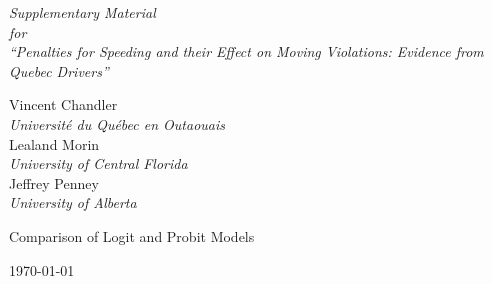 \phantom{0}
\vspace{1.0in}


\begin{centering}

{\huge \it
Supplementary Material  \\
\vspace{0.5in}
for \\
\vspace{0.5in}
``Penalties for Speeding and their Effect on Moving Violations: Evidence from Quebec Drivers'' \\
}

\vspace{1.0in}


{\large 
Vincent Chandler \\
{\it Universit\'{e} du Qu\'{e}bec en Outaouais} \\
\bigskip
Lealand Morin \\
{\it University of Central Florida} \\
\bigskip
Jeffrey Penney \\
{\it University of Alberta} \\
}

\vspace{1.0in}

{\huge
Comparison of Logit and Probit Models
}

\vspace{1.0in}



\today

\end{centering}

\pagebreak
